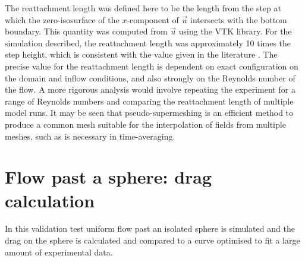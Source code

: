 The reattachment length was defined here to be the length
from the step at which the zero-isosurface of the $x$-component of $\vec{u}$ intersects with
the bottom boundary. This quantity was computed from $\vec{u}$
using the VTK library. For the simulation described, the reattachment
length was approximately 10 times the step height, which is consistent with the value
given in the literature \cite{le1997}.
The precise value for the reattachment length is dependent on exact configuration on the domain and inflow
conditions, and also strongly on the Reynolds number of the flow.
A more rigorous analysis would involve
repeating the experiment for a range of Reynolds numbers and comparing the reattachment
length of multiple model runs. It may be seen that pseudo-supermeshing is an efficient
method to produce a common mesh suitable for the interpolation of fields from multiple
meshes, such as is necessary in time-averaging.



\section{Flow past a sphere: drag calculation}

In this validation test uniform flow past an isolated sphere is simulated
and the drag on the sphere is calculated and compared to a curve optimised
to fit a large amount of experimental data.

